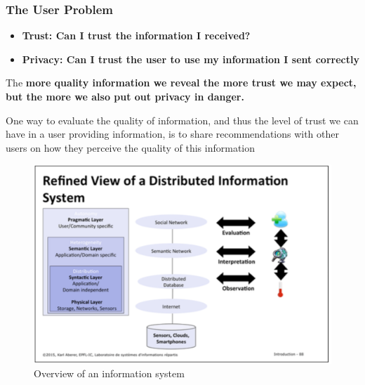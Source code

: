 \subsubsection{The User Problem}
\begin{itemize}
\item \bf{Trust:} Can I trust the information I received?
\item \bf{Privacy:} Can I trust the user to use my information I sent correctly
\end{itemize}
The \bf{more quality information} we reveal the \bf{more trust} we may expect, but the \bf{more} we also put out \bf{privacy} in danger.

One way to evaluate the quality of information, and thus the level of trust we can have in a user providing information, is to share recommendations with other users on how they perceive the quality of this information

\begin{figure}[!ht]
\begin{center}
\includegraphics[width=1\linewidth]{figures/viewIS2.png}
\end{center}
\caption{Overview of an information system}
\end{figure}


